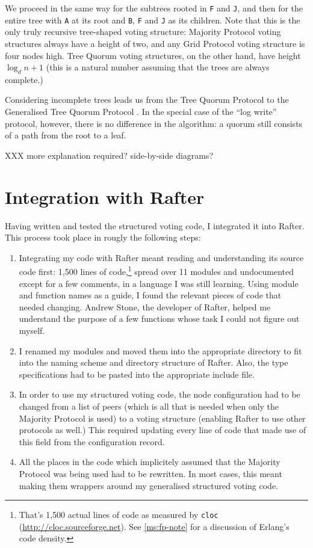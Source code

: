\documentclass[draft,11pt,chapterprefix=true,toc=bibliography,numbers=noendperiod,
               footnotes=multiple,twoside]{scrreprt}
\begin{document}
We proceed in the same way for the subtrees rooted in \texttt{F} and \texttt{J}, and then for the entire tree with \texttt{A} at its root and \texttt{B}, \texttt{F} and \texttt{J} as its children. Note that this is the only truly recursive tree-shaped voting structure: Majority Protocol voting structures always have a height of two, and any Grid Protocol voting structure is four nodes high. Tree Quorum voting structures, on the other hand, have height \(\log_d{n+1}\) (this is a natural number assuming that the trees are always complete.)


Considering incomplete trees leads us from the Tree Quorum Protocol \autocite{tree} to the Generalised Tree Quorum Protocol \autocite{gen-tree}. In the special case of the \enquote{log write} protocol, however, there is no difference in the algorithm: a quorum still consists of a path from the root to a leaf.

XXX more explanation required? side-by-side diagrams?

\section{Integration with Rafter}

Having written and tested the structured voting code, I integrated it into Rafter. This process took place in rougly the following steps:

\begin{enumerate}
    \item Integrating my code with Rafter meant reading and understanding its source code first: 1,500 lines of code,\footnote{That's 1,500 actual lines of code as measured by \texttt{cloc} (\url{http://cloc.sourceforge.net}). See \autoref{ms:fp-note} for a discussion of Erlang's code density.} spread over 11 modules and undocumented except for a few comments, in a language I was still learning. Using module and function names as a guide, I found the relevant pieces of code that needed changing. Andrew Stone, the developer of Rafter, helped me understand the purpose of a few functions whose task I could not figure out myself.
    \item I renamed my modules and moved them into the appropriate directory to fit into the naming scheme and directory structure of Rafter. Also, the type specifications had to be pasted into the appropriate include file.
    \item In order to use my structured voting code, the node configuration had to be changed from a list of peers (which is all that is needed when only the Majority Protocol is used) to a voting structure (enabling Rafter to use other protocols as well.) This required updating every line of code that made use of this field from the configuration record.
    \item All the places in the code which implicitely assumed that the Majority Protocol was being used had to be rewritten. In most cases, this meant making them wrappers around my generalised structured voting code.
\end{enumerate}
\end{document}
